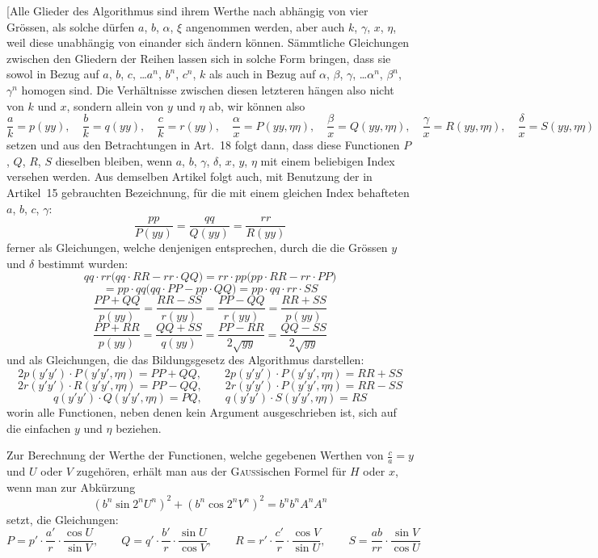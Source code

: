 \documentclass[10pt,a4paper]{article}
\begin{document}
[Alle Glieder des Algorithmus sind ihrem Werthe nach abhängig von vier
Grössen, als solche dürfen $a$, $b$, $\alpha$, $\xi$ angenommen werden, aber auch $k$, $\gamma$, $x$, $\eta$,
weil diese unabhängig von einander sich ändern können. Sämmtliche Gleichungen zwischen den Gliedern der Reihen lassen sich in solche Form bringen, dass sie sowol in Bezug auf $a$, $b$, $c$, \ldots $a^n$, $b^n$, $c^n$, $k$ als auch in Bezug auf
$\alpha$, $\beta$, $\gamma$, \ldots $\alpha^n$, $\beta^n$, $\gamma^n$ homogen sind. Die Verhältnisse zwischen diesen letzteren hängen also nicht von $k$ und $x$, sondern allein von $y$ und $\eta$ ab, wir können also
\[
\frac{a}{k}=p(yy),\quad \frac{b}{k}=q(yy),\quad \frac{c}{k}=r(yy),\quad
\frac{\alpha}{x}=P(yy,\eta\eta),\quad \frac{\beta}{x}=Q(yy,\eta\eta),\quad
\frac{\gamma}{x}=R(yy,\eta\eta),\quad \frac{\delta}{x}=S(yy,\eta\eta)
\]
setzen und aus den Betrachtungen in Art.~18 folgt dann, dass diese Functionen
$P$, $Q$, $R$, $S$ dieselben bleiben, wenn $a$, $b$, $\gamma$, $\delta$, $x$, $y$, $\eta$ mit einem beliebigen Index versehen werden. Aus demselben Artikel folgt auch, mit Benutzung der in Artikel~15 gebrauchten Bezeichnung, für die mit einem gleichen Index behafteten $a$, $b$, $c$, $\gamma$:
\[
\frac{pp}{P(yy)}=\frac{qq}{Q(yy)}=\frac{rr}{R(yy)}
\]
ferner als Gleichungen, welche denjenigen entsprechen, durch die die Grössen
$y$ und $\delta$ bestimmt wurden:
\[
qq\cdot rr\bigl(qq\cdot RR-rr\cdot QQ\bigr) = rr\cdot pp\bigl(pp\cdot RR-rr\cdot PP\bigr)
\]
\[
= pp\cdot qq\bigl(qq\cdot PP-pp\cdot QQ\bigr) = pp\cdot qq\cdot rr\cdot SS
\]
\[
\frac{PP+QQ}{p(yy)} = \frac{RR-SS}{r(yy)} = \frac{PP-QQ}{r(yy)} = \frac{RR+SS}{p(yy)}
\]
\[
\frac{PP+RR}{p(yy)} = \frac{QQ+SS}{q(yy)} = \frac{PP-RR}{2\sqrt{yy}} = \frac{QQ-SS}{2\sqrt{yy}}
\]
und als Gleichungen, die das Bildungsgesetz des Algorithmus darstellen:
\[
2p(y'y')\cdot P(y'y',\eta\eta) = PP+QQ, \qquad
2p(y'y')\cdot P(y'y',\eta\eta) = RR+SS
\]
\[
2r(y'y')\cdot R(y'y',\eta\eta) = PP-QQ, \qquad
2r(y'y')\cdot P(y'y',\eta\eta) = RR-SS
\]
\[
q(y'y')\cdot Q(y'y',\eta\eta) = PQ, \qquad
q(y'y')\cdot S(y'y',\eta\eta) = RS
\]
worin alle Functionen, neben denen kein Argument ausgeschrieben ist, sich auf
die einfachen $y$ und $\eta$ beziehen.

Zur Berechnung der Werthe der Functionen, welche gegebenen Werthen
von $\frac{c}{a}=y$ und $U$ oder $V$ zugehören, erhält man aus der \textsc{Gauss}ischen Formel
für $H$ oder $x$, wenn man zur Abkürzung
\[
(b^n\sin 2^n U^n)^2 + (b^n\cos 2^n V^n)^2 = b^n b^n A^n A^n
\]
setzt, die Gleichungen:
\[
P = p'\cdot\frac{a'}{r}\cdot\frac{\cos U}{\sin V}, \qquad
Q = q'\cdot\frac{b'}{r}\cdot\frac{\sin U}{\cos V}, \qquad
R = r'\cdot\frac{c'}{r}\cdot\frac{\cos V}{\sin U}, \qquad
S = \frac{ab}{rr}\cdot\frac{\sin V}{\cos U}
\]
\end{document}
